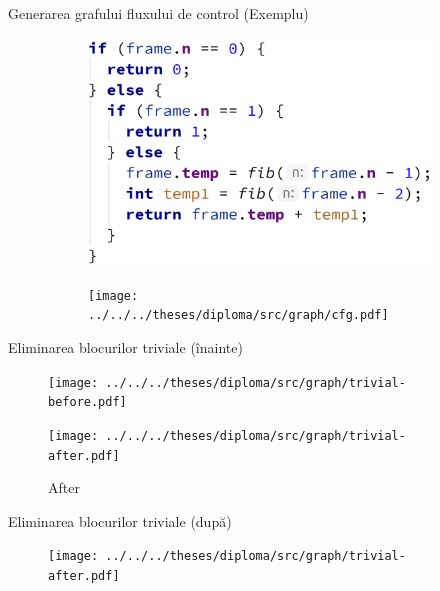 \documentclass{beamer}
\begin{document}
\begin{frame}{Generarea grafului fluxului de control (Exemplu)}
    \begin{figure}[htb]
        \begin{subfigure}{.42\textwidth}
            \centering
            \includegraphics[width=\textwidth]{img/ref-var-after.png}
        \end{subfigure}
        \hfill
        \begin{subfigure}{.42\textwidth}
            \centering
            \texttt{[image: ../../../theses/diploma/src/graph/cfg.pdf]}
        \end{subfigure}
    \end{figure}
\end{frame}

\begin{frame}{Eliminarea blocurilor triviale (înainte)}
    \begin{figure}[htb]
        \centering
        \texttt{[image: ../../../theses/diploma/src/graph/trivial-before.pdf]}
    \end{figure}
    \begin{figure}[htb]
        \centering
        \texttt{[image: ../../../theses/diploma/src/graph/trivial-after.pdf]}
        \caption{After}
    \end{figure}
\end{frame}

\begin{frame}{Eliminarea blocurilor triviale (după)}
    \begin{figure}[htb]
        \centering
        \texttt{[image: ../../../theses/diploma/src/graph/trivial-after.pdf]}
    \end{figure}
\end{frame}
\end{document}
